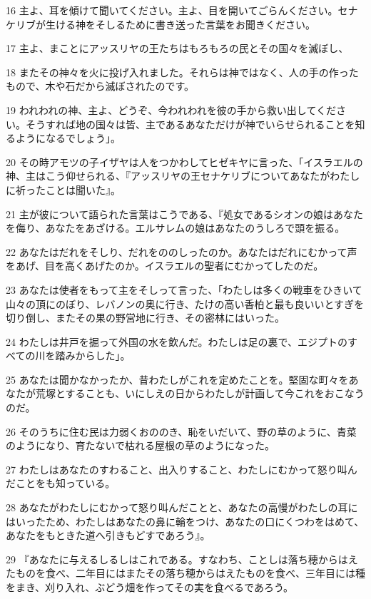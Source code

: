 \par 16 主よ、耳を傾けて聞いてください。主よ、目を開いてごらんください。セナケリブが生ける神をそしるために書き送った言葉をお聞きください。
\par 17 主よ、まことにアッスリヤの王たちはもろもろの民とその国々を滅ぼし、
\par 18 またその神々を火に投げ入れました。それらは神ではなく、人の手の作ったもので、木や石だから滅ぼされたのです。
\par 19 われわれの神、主よ、どうぞ、今われわれを彼の手から救い出してください。そうすれば地の国々は皆、主であるあなただけが神でいらせられることを知るようになるでしょう」。
\par 20 その時アモツの子イザヤは人をつかわしてヒゼキヤに言った、「イスラエルの神、主はこう仰せられる、『アッスリヤの王セナケリブについてあなたがわたしに祈ったことは聞いた』。
\par 21 主が彼について語られた言葉はこうである、『処女であるシオンの娘はあなたを侮り、あなたをあざける。エルサレムの娘はあなたのうしろで頭を振る。
\par 22 あなたはだれをそしり、だれをののしったのか。あなたはだれにむかって声をあげ、目を高くあげたのか。イスラエルの聖者にむかってしたのだ。
\par 23 あなたは使者をもって主をそしって言った、「わたしは多くの戦車をひきいて山々の頂にのぼり、レバノンの奥に行き、たけの高い香柏と最も良いいとすぎを切り倒し、またその果の野営地に行き、その密林にはいった。
\par 24 わたしは井戸を掘って外国の水を飲んだ。わたしは足の裏で、エジプトのすべての川を踏みからした」。
\par 25 あなたは聞かなかったか、昔わたしがこれを定めたことを。堅固な町々をあなたが荒塚とすることも、いにしえの日からわたしが計画して今これをおこなうのだ。
\par 26 そのうちに住む民は力弱くおののき、恥をいだいて、野の草のように、青菜のようになり、育たないで枯れる屋根の草のようになった。
\par 27 わたしはあなたのすわること、出入りすること、わたしにむかって怒り叫んだことをも知っている。
\par 28 あなたがわたしにむかって怒り叫んだことと、あなたの高慢がわたしの耳にはいったため、わたしはあなたの鼻に輪をつけ、あなたの口にくつわをはめて、あなたをもときた道へ引きもどすであろう』。
\par 29 『あなたに与えるしるしはこれである。すなわち、ことしは落ち穂からはえたものを食べ、二年目にはまたその落ち穂からはえたものを食べ、三年目には種をまき、刈り入れ、ぶどう畑を作ってその実を食べるであろう。
